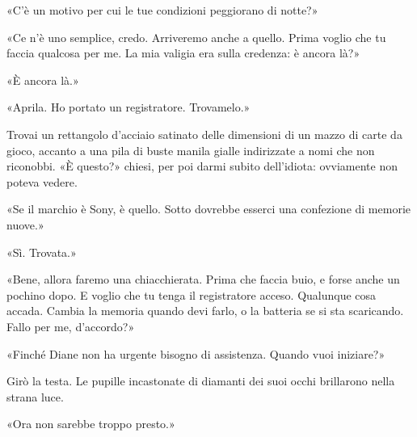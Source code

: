 «C'è un motivo per cui le tue condizioni peggiorano di notte?»

«Ce n'è uno semplice, credo. Arriveremo anche a quello. Prima voglio che
tu faccia qualcosa per me. La mia valigia era sulla credenza: è ancora
là?»

«È ancora là.»

«Aprila. Ho portato un registratore. Trovamelo.»

Trovai un rettangolo d'acciaio satinato delle dimensioni di un mazzo di
carte da gioco, accanto a una pila di buste manila gialle indirizzate a
nomi che non riconobbi. «È questo?» chiesi, per poi darmi subito
dell'idiota: ovviamente non poteva vedere.

«Se il marchio è Sony, è quello. Sotto dovrebbe esserci una confezione
di memorie nuove.»

«Sì. Trovata.»

«Bene, allora faremo una chiacchierata. Prima che faccia buio, e forse
anche un pochino dopo. E voglio che tu tenga il registratore acceso.
Qualunque cosa accada. Cambia la memoria quando devi farlo, o la
batteria se si sta scaricando. Fallo per me, d'accordo?»

«Finché Diane non ha urgente bisogno di assistenza. Quando vuoi
iniziare?»

Girò la testa. Le pupille incastonate di diamanti dei suoi occhi
brillarono nella strana luce.

«Ora non sarebbe troppo presto.»
